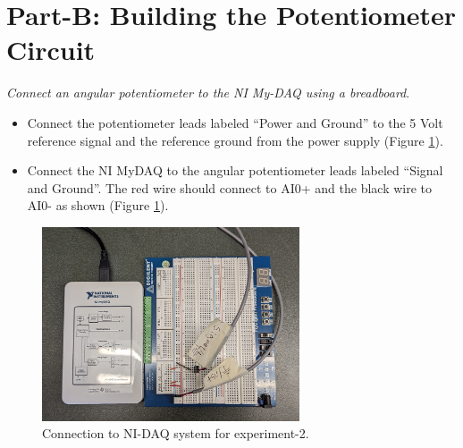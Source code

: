 \documentclass{article} %
\begin{document}
\section{Part-B: Building the Potentiometer Circuit }
\emph{Connect an angular potentiometer to the NI My-DAQ using a breadboard}.
\begin{itemize}
\item Connect the potentiometer leads labeled “Power and Ground” to the 5 Volt reference signal and the reference ground from the power supply (Figure \ref{fig:fig02}).
\item Connect the NI MyDAQ to the angular potentiometer leads labeled “Signal and Ground”. The red wire should connect to AI0+ and the black wire to AI0- as shown (Figure  \ref{fig:fig02}).
\end{itemize}

\begin{figure}[!ht]
\centering
\includegraphics[width=3.00in]{Figures/Fig01new.jpg}
\caption{Connection to NI-DAQ system for experiment-2.}
\label{fig:fig02}
\end{figure}
\end{document}
